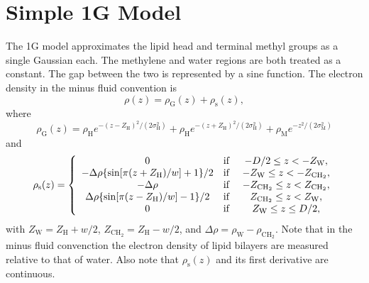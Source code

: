 \documentclass[12pt,letterpaper]{article}
\newcommand{\zw}{Z_\mathrm{W}}
\newcommand{\zchtwo}{Z_\mathrm{CH_2}}
\newcommand{\zh}{Z_\mathrm{H}}
\newcommand{\sigmah}{\sigma_\mathrm{H}}
\newcommand{\sigmam}{\sigma_\mathrm{M}}
\newcommand{\rhoh}{\rho_\mathrm{H}}
\newcommand{\rhom}{\rho_\mathrm{M}}
\newcommand{\rhog}{\rho_\mathrm{G}}
\newcommand{\rhos}{\rho_\mathrm{s}}
\newcommand{\rhow}{\rho_\mathrm{W}}
\newcommand{\rhochtwo}{\rho_\mathrm{CH_2}}
\begin{document}
\section{Simple 1G Model}
The 1G model approximates the lipid head 
and terminal methyl groups as a single 
Gaussian each. The methylene and water regions are both treated as a constant.
The gap between the two is represented by a sine function. The electron
density in the minus fluid convention is
\begin{equation}
  \rho(z) = \rhog(z) + \rhos(z),
\end{equation}
where
\begin{equation}
  \rhog(z) = \rhoh e^{-(z-\zh)^2/(2\sigmah^2)} + 
             \rhoh e^{-(z+\zh)^2/(2\sigmah^2)} + \rhom e^{-z^2/(2\sigmam^2)}
\end{equation}
and
\begin{equation}
  \rhos(z) =  \left\{
    \begin{array}{ccc}
      0 & \text{if } & -D/2 \leq z < -\zw,\\
      -\Delta\rho\braces{\sin\bracks{\pi(z+\zh)/w}+1}/2 
        & \text{if } & -\zw \leq z < -\zchtwo,\\
      -\Delta\rho & \text{if } & -\zchtwo \leq z < \zchtwo,\\
      \Delta\rho\braces{\sin\bracks{\pi(z-\zh)/w}-1}/2 
        & \text{if } & \zchtwo \leq z < \zw,\\
      0 & \text{if } & \zw \leq z \leq D/2,
    \end{array}
  \right.
\end{equation}
with $\zw=\zh+w/2$, $\zchtwo=\zh-w/2$, and $\Delta\rho=\rhow-\rhochtwo$. 
Note that in the minus fluid convenction the electron density 
of lipid bilayers are measured relative to that of water. Also note that 
$\rhos(z)$ and its first derivative are continuous.
\end{document}
